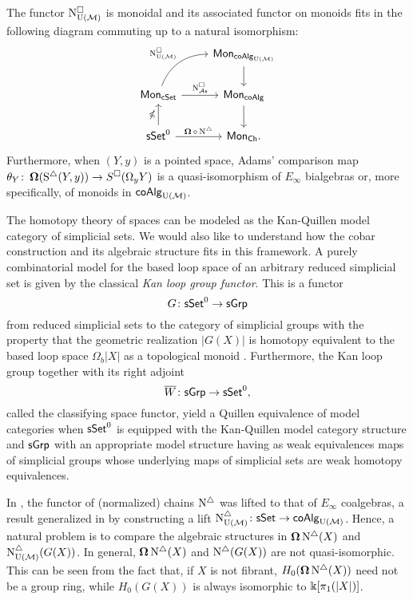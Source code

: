 \begin{theorem} \label{t:1st main thm in the intro}
	The functor $\operatorname{N^{\square}_{{\mathrm{U}(\mathcal{M})}}}$ is monoidal and its associated functor on monoids fits in the following diagram commuting up to a natural isomorphism:
	\begin{equation*}
	\begin{tikzcd}
	& \Mon_{\coAlg_\UM} \arrow[d] \\
	\Mon_{\cSet} \arrow[ru, "\cchainsUM", out=70, in=180] \arrow[r, "\cchainsAS"]
	& \Mon_{\coAlg} \arrow[d] \\
	\sSet^0 \arrow[r, "\cobar \circ \schains"] \arrow[u, "\gcobar"]
	& \Mon_{\Ch}.
	\end{tikzcd}
	\end{equation*}
	Furthermore, when $(Y, y)$ is a pointed space, Adams' comparison map $\theta_Y \colon \operatorname{\mathbf{\Omega}}(\operatorname{S^{\triangle}}(Y, y)) \to S^{\square}(\Omega_y Y)$ is a quasi-isomorphism of $E_\infty$ bialgebras or, more specifically, of monoids in $\mathsf{coAlg}_{\mathrm{U}(\mathcal{M})}$.
\end{theorem} 


The homotopy theory of spaces can be modeled as the Kan-Quillen model category of simplicial sets. We would also like to understand how the cobar construction and its algebraic structure fits in this framework. A purely combinatorial model for the based loop space of an arbitrary reduced simplicial set is given by the classical \textit{Kan loop group functor}.
This is a functor 
$$G\colon \mathsf{sSet}^0 \to \mathsf{sGrp}$$
from reduced simplicial sets to the category of simplicial groups with the property that the geometric realization $|G(X)|$ is homotopy equivalent to the based loop space $\Omega_b|X|$ as a topological monoid \cite{berger1995loops}. Furthermore, the Kan loop group together with its right adjoint $$\overline{W} \colon  \mathsf{sGrp} \to \mathsf{sSet}^0,$$ called the classifying space functor, yield a Quillen equivalence of model categories when $\mathsf{sSet}^0$ is equipped with the Kan-Quillen model category structure and $\mathsf{sGrp}$ with an appropriate model structure having as weak equivalences maps of simplicial groups whose underlying maps of simplicial sets are weak homotopy equivalences. 

In \cite{mcclure2003multivariable, berger2004combinatorial}, the functor of (normalized) chains $\operatorname{N^{\triangle}}$ was lifted to that of $E_\infty$ coalgebras, a result generalized in \cite{medina2020prop1} by constructing a lift $\operatorname{N^{\triangle}_{{\mathrm{U}(\mathcal{M})}}} \colon \mathsf{sSet} \to \mathsf{coAlg}_{\mathrm{U}(\mathcal{M})}$. Hence, a natural problem is to compare the algebraic structures in $\operatorname{\mathbf{\Omega}} \operatorname{N^{\triangle}}(X)$ and $\operatorname{N^{\triangle}_{{\mathrm{U}(\mathcal{M})}}}(G(X))$. In general, $\operatorname{\mathbf{\Omega}} \operatorname{N^{\triangle}}(X)$ and $\operatorname{N^{\triangle}}(G(X))$ are not quasi-isomorphic.
This can be seen from the fact that, if $X$ is not fibrant, $H_0(\operatorname{\mathbf{\Omega}} \operatorname{N^{\triangle}}(X))$ need not be a group ring, while $H_0(G(X))$ is always isomorphic to $ \Bbbk[\pi_1(|X|)]$.

